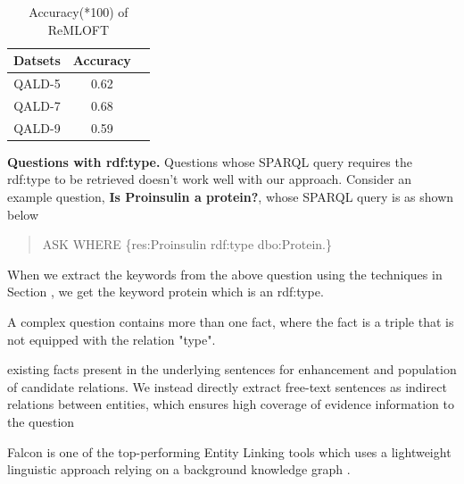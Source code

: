 \begin{table}[H]
    \centering
    \begin{tabular}{|c|c|c|}
     \hline
     \textbf{Datsets} & \textbf{Accuracy} \\
    \hline
     QALD-5 & 0.62 \\
    \hline
    QALD-7 & 0.68 \\
    \hline
        QALD-9 & 0.59 \\
    \hline
    \end{tabular}
    \caption{Accuracy(*100) of ReMLOFT}
    \label{tab:accuracy}
\end{table}





\textbf{Questions with rdf:type.} Questions whose SPARQL query requires the rdf:type to be retrieved doesn't work well with our approach. Consider an example question, \textbf{Is Proinsulin a protein?}, whose SPARQL query is as shown below
\begin{quote}
{\selectfont
ASK WHERE \{res:Proinsulin rdf:type dbo:Protein.\} }
\end{quote}
When we extract the keywords from the above question using the techniques in Section \label{preprocessnlq}, we get the keyword protein which is an rdf:type. 


A complex question contains more than one fact, where the fact is a triple that is not equipped with the relation "type".


existing facts present in the underlying sentences for enhancement and population of candidate relations. We instead directly extract free-text sentences as indirect relations between entities, which ensures high coverage of evidence information to the question


Falcon is one of the top-performing Entity Linking tools which uses a lightweight linguistic approach relying on a background knowledge graph \cite{falcon}.